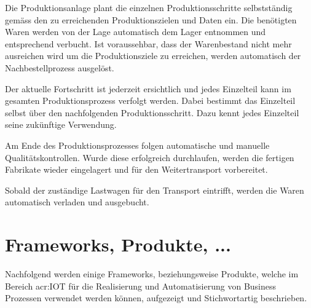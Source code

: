\begin{itemize}
{Die Produktionsanlage plant die einzelnen Produktionsschritte selbstständig gemäss den zu erreichenden Produktionszielen und Daten ein. Die benötigten Waren werden von der Lage automatisch dem Lager entnommen und entsprechend verbucht. Ist voraussehbar, dass der Warenbestand nicht mehr ausreichen wird um die Produktionsziele zu erreichen, werden automatisch der Nachbestellprozess ausgelöst.

Der aktuelle Fortschritt ist jederzeit ersichtlich und jedes Einzelteil kann im gesamten Produktionsprozess verfolgt werden. Dabei bestimmt das Einzelteil selbst über den nachfolgenden Produktionsschritt. Dazu kennt jedes Einzelteil seine zukünftige Verwendung.

Am Ende des Produktionsprozesses folgen automatische und manuelle Qualitätskontrollen. Wurde diese erfolgreich durchlaufen, werden die fertigen Fabrikate wieder eingelagert und für den Weitertransport vorbereitet. 

Sobald der zuständige Lastwagen für den Transport eintrifft, werden die Waren automatisch verladen und ausgebucht.}

\end{itemize}


\section{Frameworks, Produkte, ...}
Nachfolgend werden einige Frameworks, beziehungsweise Produkte, welche im Bereich \gls{acr:IOT} für die Realisierung und Automatisierung von Business Prozessen verwendet werden können, aufgezeigt und Stichwortartig beschrieben.


